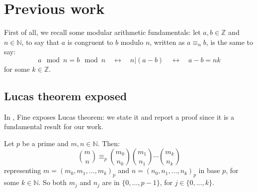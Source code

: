 

\section{Previous work}
\label{sec:previous:work}


First of all, we recall some modular arithmetic fundamentals: let $a,b\in\mathbb{Z}$
and $n\in\mathbb{N}$, to say that $a$ is congruent to $b$ modulo $n$,
written as $a \equiv_{n} b$, is the same to say:
\begin{displaymath}
    a\mod n = b\mod n\quad \leftrightarrow\quad n \left| (a-b)\right. \quad\leftrightarrow \quad a - b = nk
\end{displaymath}
for some $k\in\mathbb{Z}$.

\subsection{Lucas theorem exposed}

In \cite{fine:1947}, Fine exposes Lucas theorem: we state it and report a proof since
it is a fundamental result for our work. 

\begin{theorem}
    Let $p$ be a prime and $m,n\in\mathbb{N}$. Then:
    \begin{displaymath}
        {{m}\choose{n}} \equiv_{p} 
            {{m_{0}}\choose{n_{0}}} 
            {{m_{1}}\choose{n_{1}}} 
            \cdots 
            {{m_{k}}\choose{n_{k}}} 
    \end{displaymath}
    representing $m=\left(m_{0},m_{1},\ldots,m_{k}\right)_{p}$ and
    $n=\left(n_{0},n_{1},\ldots,n_{k}\right)_{p}$ in base $p$, for some $k\in\mathbb{N}$.
    So both $m_{j}$ and $n_{j}$ are in $\lbrace 0,\ldots, p-1 \rbrace$, for
    $j\in\lbrace 0,\ldots,k\rbrace$.
    \label{thm:lucas:theorem}
\end{theorem}

